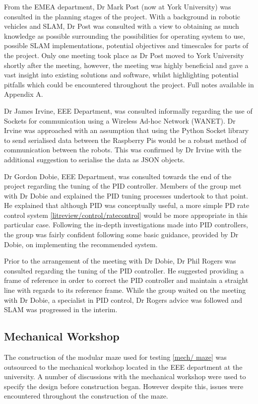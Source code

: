 From the EMEA department, Dr Mark Post (now at York University) 
was consulted in the planning stages of the project. With a 
background in robotic vehicles and SLAM, Dr Post was consulted 
with a view to obtaining as much knowledge as possible 
surrounding the possibilities for operating system to use, 
possible SLAM implementations, potential objectives and 
timescales for parts of the project. Only one meeting took place 
as Dr Post moved to York University shortly after the meeting, 
however, the meeting was highly beneficial and gave a vast 
insight into existing solutions and software, whilst highlighting 
potential pitfalls which could be encountered throughout 
the project. Full notes available in Appendix A. 

Dr James Irvine, EEE Department, was consulted informally  
regarding the use of Sockets for communication using a Wireless 
Ad-hoc Network (WANET). Dr Irvine was approached with an 
assumption that using the Python Socket library to send 
serialised data between the Raspberry Pis would be a robust 
method of communication between the robots. This was confirmed 
by Dr Irvine with the additional suggestion to serialise the data
as JSON objects. 


Dr Gordon Dobie, EEE Department, was consulted towards the end 
of the project regarding the tuning of the PID controller. 
Members of the group met with Dr Dobie and explained the PID tuning 
processes undertook to that point. He explained that although 
PID was conceptually useful, a more simple PD rate control system 
\ref{litreview/control/ratecontrol} would be more appropriate 
in this particular case. Following the in-depth investigations made 
into PID controllers, the group was fairly confident following some 
basic guidance, provided by Dr Dobie, on implementing the 
recommended system. 

Prior to the arrangement of the meeting with Dr Dobie, Dr Phil 
Rogers was consulted regarding the tuning of the PID controller. 
He suggested providing a frame of reference in order to correct 
the PID controller and maintain a straight line with regards to 
its reference frame. While the group waited on the meeting with 
Dr Dobie, a specialist in PID control, Dr Rogers advice was 
followed and SLAM was progressed in the interim.   

\subsection{Mechanical Workshop}\label{pm/mechshop}
The construction of the modular maze used for testing \ref{mech/
maze} was outsourced to the mechanical workshop located in the 
EEE department at the university. A number of discussions with 
the mechanical workshop were used to specify the design  
before construction began. However despite this, issues were 
encountered throughout the construction of the maze. 

